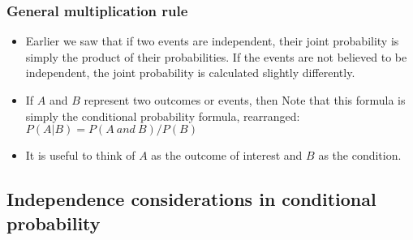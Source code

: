\documentclass[slidestop,compress,mathserif]{beamer}
\begin{document}

\begin{frame}
\frametitle{General multiplication rule}

\begin{itemize}

\item Earlier we saw that if two events are independent, their joint probability is simply the product of their probabilities. If the events are not believed to be independent, the joint probability is calculated slightly differently.

\pause

\item If $A$ and $B$ represent two outcomes or events, then
\formula{\[ P(A~and~B) = P(A|B) \times P(B) \]}
Note that this formula is simply the conditional probability formula, rearranged: $P(A|B)= P(A~and~B) / P(B)$
\pause

\item It is useful to think of $A$ as the outcome of interest and $B$ as the condition.

\end{itemize}

\end{frame}


\subsection{Independence considerations in conditional probability}

\end{document}
